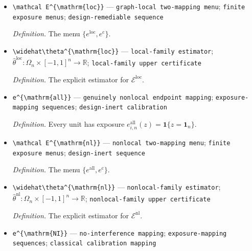\documentclass{article}
\begin{document}
\begin{itemize}
  \item \texttt{\textbackslash{}\allowbreak{}mathcal E\textasciicircum{}\{\textbackslash{}\allowbreak{}mathrm\{loc\}\allowbreak{}\}\allowbreak{}} --- \texttt{graph-\allowbreak{}local two-\allowbreak{}mapping menu}; \texttt{finite exposure menus}; \texttt{design-\allowbreak{}remediable sequence}
  \par\smallskip\noindent\emph{Definition.} The menu \(\{e^{\mathrm{loc}},e^{\mathrm c}\}\).
  \item \texttt{\textbackslash{}\allowbreak{}widehat\textbackslash{}\allowbreak{}theta\textasciicircum{}\{\textbackslash{}\allowbreak{}mathrm\{loc\}\allowbreak{}\}\allowbreak{}} --- \texttt{local-\allowbreak{}family estimator}; \(\widehat\theta^{\mathrm{loc}}:\Omega_n\times[-1,1]^n\to\mathbb R\); \texttt{local-\allowbreak{}family upper certificate}
  \par\smallskip\noindent\emph{Definition.} The explicit estimator for \(\mathcal E^{\mathrm{loc}}\).
  \item \texttt{e\textasciicircum{}\{\textbackslash{}\allowbreak{}mathrm\{all\}\allowbreak{}\}\allowbreak{}} --- \texttt{genuinely nonlocal endpoint mapping}; \texttt{exposure-\allowbreak{}mapping sequences}; \texttt{design-\allowbreak{}inert calibration}
  \par\smallskip\noindent\emph{Definition.} Every unit has exposure \(e^{\mathrm{all}}_{i,n}(z)=\mathbf 1\{z=\mathbf 1_n\}\).
  \item \texttt{\textbackslash{}\allowbreak{}mathcal E\textasciicircum{}\{\textbackslash{}\allowbreak{}mathrm\{nl\}\allowbreak{}\}\allowbreak{}} --- \texttt{nonlocal two-\allowbreak{}mapping menu}; \texttt{finite exposure menus}; \texttt{design-\allowbreak{}inert sequence}
  \par\smallskip\noindent\emph{Definition.} The menu \(\{e^{\mathrm{all}},e^{\mathrm c}\}\).
  \item \texttt{\textbackslash{}\allowbreak{}widehat\textbackslash{}\allowbreak{}theta\textasciicircum{}\{\textbackslash{}\allowbreak{}mathrm\{nl\}\allowbreak{}\}\allowbreak{}} --- \texttt{nonlocal-\allowbreak{}family estimator}; \(\widehat\theta^{\mathrm{nl}}:\Omega_n\times[-1,1]^n\to\mathbb R\); \texttt{nonlocal-\allowbreak{}family upper certificate}
  \par\smallskip\noindent\emph{Definition.} The explicit estimator for \(\mathcal E^{\mathrm{nl}}\).
  \item \texttt{e\textasciicircum{}\{\textbackslash{}\allowbreak{}mathrm\{NI\}\allowbreak{}\}\allowbreak{}} --- \texttt{no-\allowbreak{}interference mapping}; \texttt{exposure-\allowbreak{}mapping sequences}; \texttt{classical calibration mapping}

\end{itemize}
\end{document}
